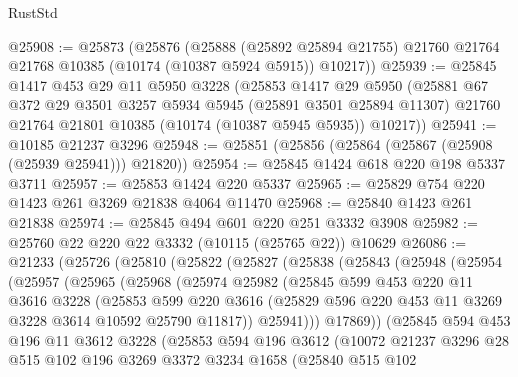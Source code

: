 \begin{lexlean}{RustStd}
\begin{coremodule}
@25908 := @25873
    (@25876
      (@25888
        (@25892 @25894 @21755)
        @21760
        @21764
        @21768
        @10385
        (@10174 (@10387 @5924 @5915))
        @10217))
@25939 := @25845
    @1417
    @453
    @29
    @11
    @5950
    @3228
    (@25853
      @1417
      @29
      @5950
      (@25881
        @67
        @372
        @29
        @3501
        @3257
        @5934
        @5945
        (@25891 @3501 @25894 @11307)
        @21760
        @21764
        @21801
        @10385
        (@10174 (@10387 @5945 @5935))
        @10217))
@25941 := @10185 @21237 @3296
@25948 := @25851 (@25856 (@25864 (@25867 (@25908 (@25939 @25941))) @21820))
@25954 := @25845 @1424 @618 @220 @198 @5337 @3711
@25957 := @25853 @1424 @220 @5337
@25965 := @25829 @754 @220 @1423 @261 @3269 @21838 @4064 @11470
@25968 := @25840 @1423 @261 @21838
@25974 := @25845 @494 @601 @220 @251 @3332 @3908
@25982 := @25760 @22 @220 @22 @3332 (@10115 (@25765 @22)) @10629
@26086 := @21233
    (@25726
      (@25810
        (@25822
          (@25827
            (@25838
              (@25843
                (@25948
                  (@25954
                    (@25957
                      (@25965
                        (@25968
                          (@25974
                            @25982
                            (@25845
                              @599
                              @453
                              @220
                              @11
                              @3616
                              @3228
                              (@25853
                                @599
                                @220
                                @3616
                                (@25829 @596 @220 @453 @11 @3269 @3228 @3614 @10592 @25790 @11817))
                              @25941)))
                        @17869))
                    (@25845
                      @594
                      @453
                      @196
                      @11
                      @3612
                      @3228
                      (@25853
                        @594
                        @196
                        @3612
                        (@10072
                          @21237
                          @3296
                          @28
                          @515
                          @102
                          @196
                          @3269
                          @3372
                          @3234
                          @1658
                          (@25840
                            @515
                            @102

\end{coremodule}
\end{lexlean}
